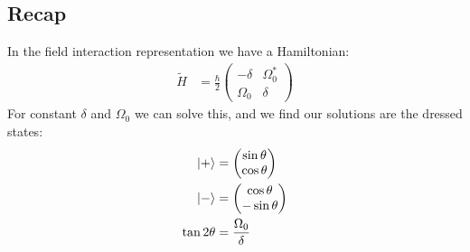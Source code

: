 \subsection{Recap}
In the field interaction representation we have a Hamiltonian:
\begin{align*}
	\tilde{H} &= \frac{\hbar}{2} \begin{pmatrix}
		-\delta & \Omega_0^* \\
		\Omega_0 & \delta
			      \end{pmatrix}
\end{align*}
For constant $\delta$ and $\Omega_0$ we can solve this, and we find our solutions are the dressed states:
\begin{align*}
	\ket{+} &= \begin{pmatrix}
		\sin\theta \\
		\cos\theta
	    \end{pmatrix} \\
	\ket{-} &= \begin{pmatrix}
		\cos\theta \\
		-\sin\theta
	    \end{pmatrix} \\
	\tan 2\theta &= \frac{\Omega_0}{\delta}
\end{align*}
